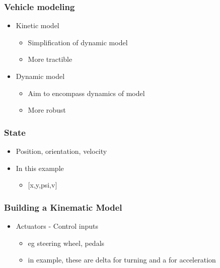 \documentclass[11pt,xcolor={dvipsnames},usepdftitle=false]{beamer}
\begin{document}
\begin{frame}
  \frametitle{Vehicle modeling}
  \begin{itemize}
      \small\item Kinetic model
          \begin{itemize}
              \small\item Simplification of dynamic model
              \small\item More tractible
          \end{itemize}
      \small\item Dynamic model
          \begin{itemize}
              \small\item Aim to encompass dynamics of model
              \small\item More robust
          \end{itemize}
  \end{itemize}

\end{frame}

\begin{frame}
  \frametitle{State}
  \begin{itemize}
      \small\item Position, orientation, velocity
      \small\item In this example
        \begin{itemize}
          \small\item $[$x,y,psi,v$]$
        \end{itemize}
  \end{itemize}

\end{frame}

\begin{frame}
  \frametitle{Building a Kinematic Model}
  \begin{itemize}
    \small\item Actuators - Control inputs 
      \begin{itemize}
        \small\item eg steering wheel, pedals
        \small\item in example, these are delta for turning and a for acceleration
      \end{itemize}
  \end{itemize}

\end{frame}
\end{document}
